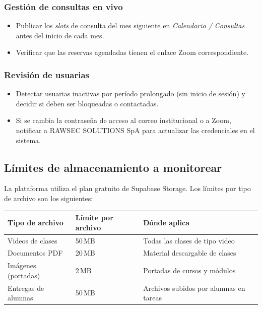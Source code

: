 \documentclass[a4paper,11pt]{article}
\begin{document}
\subsubsection*{Gesti\'on de consultas en vivo}
\begin{itemize}
  \item Publicar los \emph{slots} de consulta del mes siguiente en
        \emph{Calendario / Consultas} antes del inicio de cada mes.
  \item Verificar que las reservas agendadas tienen el enlace Zoom correspondiente.
\end{itemize}

\subsubsection*{Revisi\'on de usuarias}
\begin{itemize}
  \item Detectar usuarias inactivas por per\'iodo prolongado (sin inicio de sesi\'on)
        y decidir si deben ser bloqueadas o contactadas.
  \item Si se cambia la contrase\~na de acceso al correo institucional o a Zoom,
        notificar a RAWSEC SOLUTIONS SpA para actualizar las credenciales en el sistema.
\end{itemize}

\subsection{L\'imites de almacenamiento a monitorear}

La plataforma utiliza el plan gratuito de Supabase Storage. Los l\'imites por tipo
de archivo son los siguientes:

\begin{center}
\renewcommand{\arraystretch}{1.4}
\begin{tabular}{@{}L{5cm}C{3.5cm}L{6cm}@{}}
  \toprule
  \textbf{Tipo de archivo} & \textbf{L\'imite por archivo} & \textbf{D\'onde aplica} \\
  \midrule
  Videos de clases         & 50\,MB & Todas las clases de tipo video \\
  Documentos PDF           & 20\,MB & Material descargable de clases \\
  Im\'agenes (portadas)    &  2\,MB & Portadas de cursos y m\'odulos \\
  Entregas de alumnas      & 50\,MB & Archivos subidos por alumnas en tareas \\
  \bottomrule
\end{tabular}
\end{center}
\end{document}
